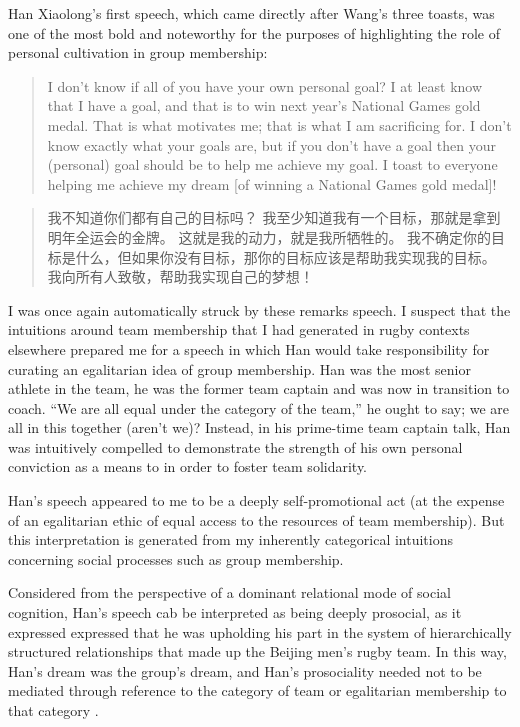 \begin{CJK}{UTF8}{gbsn}
Han Xiaolong's first speech, which came directly after Wang's three toasts, was one of the most bold and noteworthy for the purposes of highlighting the role of personal cultivation in group membership:
     \begin{quote}
       I don’t know if all of you have your own personal goal?  I at least know that I have a goal, and that is to win next year’s National Games gold medal.  That is what motivates me; that is what I am sacrificing for.  I don’t know exactly what your goals are, but if you don't have a goal then your (personal) goal should be to help me achieve my goal.  I toast to everyone helping me achieve my dream [of winning a National Games gold medal]!
     \end{quote}
     \begin{quote}
         我不知道你们都有自己的目标吗？ 我至少知道我有一个目标，那就是拿到明年全运会的金牌。 这就是我的动力，就是我所牺牲的。 我不确定你的目标是什么，但如果你没有目标，那你的目标应该是帮助我实现我的目标。 我向所有人致敬，帮助我实现自己的梦想！
     \end{quote}

I was once again automatically struck by these remarks speech. I suspect that the intuitions around team membership that I had generated in rugby contexts elsewhere prepared me for a speech in which Han would take responsibility for curating an egalitarian idea of group membership. Han was the most senior athlete in the team, he was the former team captain and was now in transition to coach.  ``We are all equal under the category of the team,'' he ought to say; we are all in this together (aren’t we)?  Instead, in his prime-time team captain talk, Han was intuitively compelled to demonstrate the strength of his own personal conviction as a means to in order to foster team solidarity.

Han's speech appeared to me to be a deeply self-promotional act (at the expense of an egalitarian ethic of equal access to the resources of team membership). But this interpretation is generated from my inherently categorical intuitions concerning social processes such as group membership.

Considered from the perspective of a dominant relational mode of social cognition, Han's speech cab be interpreted as being deeply prosocial, as it expressed expressed that he was upholding his part in the system of hierarchically structured relationships that made up the Beijing men's rugby team.  In this way, Han's dream was the group's dream, and Han's prosociality needed not to be mediated through reference to the category of team or egalitarian membership to that category \citep{Liu2009}.


\end{CJK}
